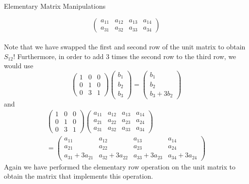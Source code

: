 \documentclass[smaller,hyperref={CJKbookmarks=true}]{beamer}
\begin{document}
\begin{frame}{Elementary Matrix Manipulations}
\begin{spacing}{1}
\[\begin{pmatrix}
                 a_{11} & a_{12} & a_{13} & a_{14}\\
                 a_{31} & a_{32} & a_{33} & a_{34}
               \end{pmatrix}\]
                \\[8pt]
               Note that we have swapped the first and second row of the unit matrix to
obtain $S_{12}$!
\newpage
Furthermore, in order to add 3 times the second row to the third row, we
would use
\[\begin{pmatrix}
    1 & 0 & 0 \\
    0 & 1 & 0 \\
    0 & 3 & 1
  \end{pmatrix}\begin{pmatrix}
                 b_1 \\
                 b_2 \\
                 b_3
               \end{pmatrix}=\begin{pmatrix}
                               b_1 \\
                               b_2 \\
                               b_3+3b_2
                             \end{pmatrix}\]
and
\begin{multline*}
  \begin{pmatrix}
    1 & 0 & 0 \\
    0 & 1 & 0 \\
    0 & 3 & 1
  \end{pmatrix}\begin{pmatrix}
                 a_{11} & a_{12} & a_{13} & a_{14}\\
                 a_{21} & a_{22} & a_{23} & a_{24}\\
                 a_{31} & a_{32} & a_{33} & a_{34}
               \end{pmatrix} \\
  =\begin{pmatrix}
                 a_{11} & a_{12} & a_{13} & a_{14}\\
                 a_{21} & a_{22} & a_{23} & a_{24}\\
                 a_{31}+3a_{21} & a_{32}+3a_{22} & a_{33}+3a_{23} & a_{34}+3a_{24}
               \end{pmatrix}
\end{multline*}
Again we have performed the elementary row operation on the unit matrix to obtain the matrix that implements this operation.

\end{spacing}
\end{frame}
\end{document}
